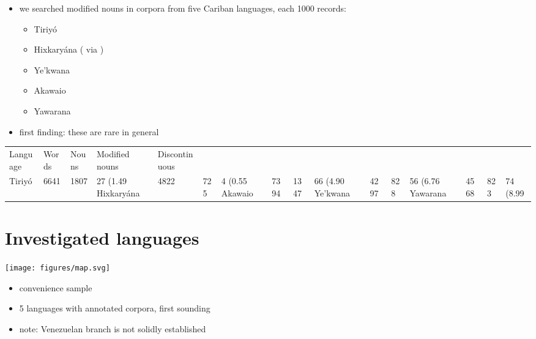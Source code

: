 \documentclass[10pt]{article}
\begin{document}
\begin{itemize}
\tightlist
\item
  we searched modified nouns in corpora from five Cariban languages,
  each 1000 records:

  \begin{itemize}
  \tightlist
  \item
    Tiriyó \parencites{meiraDBtrio}
  \item
    Hixkaryána (\textcites{derbyshire1965textos} via
    \textcites{meiraDBhixka})
  \item
    Ye'kwana \parencites{caceresDByekwana}{caceres2014elar}
  \item
    Akawaio \parencites{akawaiocaesar2003}
  \item
    Yawarana \parencites{caceres2020flex}{caceres2022yawarana}
  \end{itemize}
\item
  first finding: these are rare in general
\end{itemize}\begin{tabular}[t]{lllll}

  Language & Words & Nouns & Modified nouns & Discontinuous \\

    Tiriyó &  6641 &  1807 &     27 (1.49%
Hixkaryána &  4822 &   725 &      4 (0.55%
   Akawaio &  7394 &  1347 &     66 (4.90%
  Ye'kwana &  4297 &   828 &     56 (6.76%
  Yawarana &  4568 &   823 &     74 (8.99%

\end{tabular}

\section{Investigated languages}

\texttt{[image: figures/map.svg]}

\begin{itemize}
\tightlist
\item
  convenience sample
\item
  5 languages with annotated corpora, first sounding
\item
  note: Venezuelan branch is not solidly established
\end{itemize}
\end{document}
